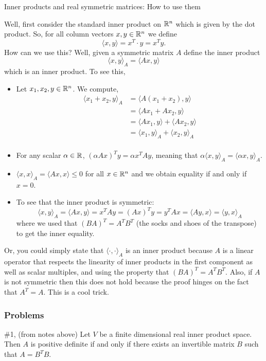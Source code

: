\documentclass{article}
\begin{document}
Inner products and real symmetric matrices: How to use them

Well, first consider the standard inner product on $\mathbb R^n$ which is given by the dot product. So, for all column vectors $x,y\in\mathbb R^n$ we define
	\[\langle x, y\rangle = x^T\cdot y = x^Ty.\]
How can we use this? Well, given a symmetric matrix $A$ define the inner product 
	\[\langle x, y\rangle_A = \langle Ax, y\rangle \]
which is an inner product. To see this, 
	\begin{itemize}
		\item Let $x_1, x_2, y\in \mathbb R^n$. We compute, 
			\begin{align*}	\langle x_1 + x_2, y \rangle_A 
							& = \langle A(x_1 + x_2), y \rangle\\
							& = \langle Ax_1 + Ax_2, y \rangle\\
							& = \langle Ax_1, y\rangle + \langle Ax_2, y \rangle\\
							& = \langle x_1, y\rangle_A + \langle x_2, y \rangle_A\\
			\end{align*}
		\item For any scalar $\alpha\in\mathbb R$, $(\alpha Ax)^Ty = \alpha x^TAy$, meaning that
			 $\alpha \langle x,y \rangle_A = \langle \alpha x, y\rangle_A$.
		\item $\langle x, x \rangle_A = \langle Ax, x \rangle \leq 0$ for all $x\in\mathbb R^n$ and we obtain equality if and only if $x= 0$. 
		\item To see that the inner product is symmetric: 
			\[ \langle x, y\rangle_A = \langle Ax, y\rangle = x^TAy = (Ax)^T y = y^T Ax = \langle Ay, x\rangle = \langle y, x\rangle_A \]
			where we used that $(BA)^T = A^T B^T$ (the socks and shoes of the transpose) to get the inner equality.
	\end{itemize}
Or, you could simply state that $\langle \cdot, \cdot \rangle_A$ is an inner product because $A$ is a linear operator that respects the linearity of inner products in the first component as well as scalar multiples, and using the property that $(BA)^T = A^T B^T$. Also, if $A$ is not symmetric then this does not hold because the proof hinges on the fact that $A^T = A$. This is a cool trick.

\break
	
\subsubsection{Problems}

\begin{problem}{\#1, (from notes above)} Let $V$ be a finite dimensional real inner product space. Then $A$ is positive definite if and only if there exists an invertible matrix $B$ such that $A = B^T B$.
\end{problem}
\end{document}
